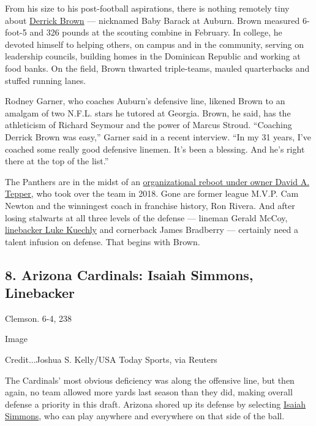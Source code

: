 From his size to his post-football aspirations, there is nothing
remotely tiny about
\href{https://www.nytimes3xbfgragh.onion/article/derrick-brown.html}{Derrick
Brown} --- nicknamed Baby Barack at Auburn. Brown measured 6-foot-5 and
326 pounds at the scouting combine in February. In college, he devoted
himself to helping others, on campus and in the community, serving on
leadership councils, building homes in the Dominican Republic and
working at food banks. On the field, Brown thwarted triple-teams, mauled
quarterbacks and stuffed running lanes.

Rodney Garner, who coaches Auburn's defensive line, likened Brown to an
amalgam of two N.F.L. stars he tutored at Georgia. Brown, he said, has
the athleticism of Richard Seymour and the power of Marcus Stroud.
``Coaching Derrick Brown was easy,'' Garner said in a recent interview.
``In my 31 years, I've coached some really good defensive linemen. It's
been a blessing. And he's right there at the top of the list.''

The Panthers are in the midst of an
\href{https://www.nytimes3xbfgragh.onion/2020/03/24/sports/football/cam-newton-panthers-injury-release.html}{organizational
reboot under owner David A. Tepper,} who took over the team in 2018.
Gone are former league M.V.P. Cam Newton and the winningest coach in
franchise history, Ron Rivera. And after losing stalwarts at all three
levels of the defense --- lineman Gerald McCoy,
\href{https://www.nytimes3xbfgragh.onion/2020/01/15/sports/football/luke-kuechly-concussions-retire.html}{linebacker
Luke Kuechly} and cornerback James Bradberry --- certainly need a talent
infusion on defense. That begins with Brown.

\hypertarget{8-arizona-cardinals-isaiah-simmons-linebacker}{%
\subsection{8. Arizona Cardinals: Isaiah Simmons,
Linebacker}\label{8-arizona-cardinals-isaiah-simmons-linebacker}}

Clemson. 6-4, 238

Image

Credit...Joshua S. Kelly/USA Today Sports, via Reuters

The Cardinals' most obvious deficiency was along the offensive line, but
then again, no team allowed more yards last season than they did, making
overall defense a priority in this draft. Arizona shored up its defense
by selecting
\href{https://www.nytimes3xbfgragh.onion/article/isaiah-simmons.html}{Isaiah
Simmons}, who can play anywhere and everywhere on that side of the ball.

